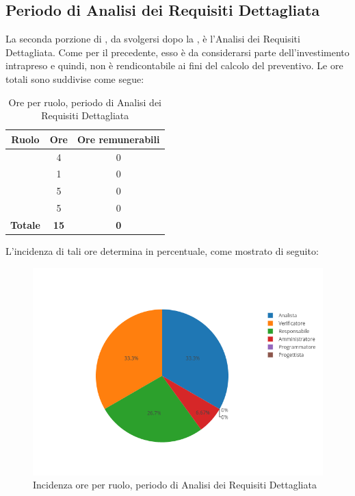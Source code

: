 \subsection{Periodo di Analisi dei Requisiti Dettagliata}
La seconda porzione di \AdR, da svolgersi dopo la \RR, è l'Analisi dei Requisiti Dettagliata. Come per il precedente, esso è da considerarsi parte dell'investimento intrapreso e quindi, non è rendicontabile ai fini del calcolo del preventivo. Le ore totali sono suddivise come segue:

\begin{table}[H]
	\begin{center}
		\begin{tabular}{|c|c|c|}
			\hline
			\textbf{Ruolo}	& \textbf{Ore}	& \textbf{Ore remunerabili} \\
			\hline
			\Res	&   4 	&  0  \\
			\hline
			\Amm	&   1	&  0	\\
			\hline
			\Ana	&   5	&  0	\\
			\hline
			\Ver	&   5	&  0	\\
			\hline
			\textbf{Totale} & \textbf{15} & \textbf{0} \\
			\hline
		\end{tabular}
	\end{center}
	\caption{Ore per ruolo, periodo di Analisi dei Requisiti Dettagliata}
\end{table}

L'incidenza di tali ore determina in percentuale, come mostrato di seguito:
\begin{figure}[H]
	\centering
	\includegraphics[scale=0.6]{img/AnalisiRequisitiDettaglio.png}
	\caption{Incidenza ore per ruolo, periodo di Analisi dei Requisiti Dettagliata}
\end{figure}

